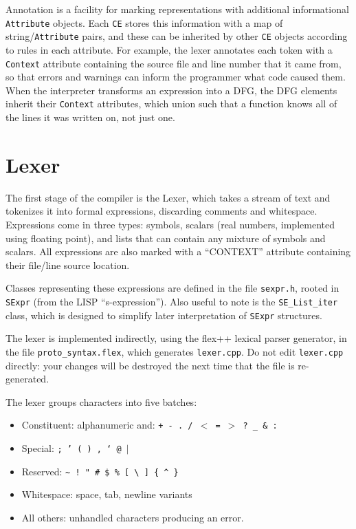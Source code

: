 \documentclass{article}
\newcommand\file[1]{{\tt #1}}
\begin{document}
Annotation is a facility for marking representations with additional
informational {\tt Attribute} objects.  Each {\tt CE} stores this information
with a map of string/{\tt Attribute} pairs, and these can be inherited by other
{\tt CE} objects according to rules in each attribute. For example, the lexer
annotates each token with a {\tt Context} attribute containing the source file
and line number that it came from, so that errors and warnings can inform the
programmer what code caused them.  When the interpreter transforms an expression
into a DFG, the DFG elements inherit their {\tt Context} attributes, which union
such that a function knows all of the lines it was written on, not just one.


\section{Lexer}
\label{s:lexer}

The first stage of the compiler is the Lexer, which takes a stream of text and
tokenizes it into formal expressions, discarding comments and whitespace.
Expressions come in three types: symbols, scalars (real numbers, implemented
using floating point), and lists that can contain any mixture of symbols and
scalars.  All expressions are also marked with a ``CONTEXT'' attribute
containing their file/line source location.

Classes representing these expressions are defined in the file \file{sexpr.h},
rooted in {\tt SExpr} (from the LISP ``s-expression'').  Also useful to note is
the {\tt SE\_List\_iter} class, which is designed to simplify later
interpretation of {\tt SExpr} structures.

The lexer is implemented indirectly, using the flex++ lexical parser generator,
in the file \file{proto\_syntax.flex}, which generates \file{lexer.cpp}.  Do not
edit \file{lexer.cpp} directly: your changes will be destroyed the next time
that the file is re-generated.

The lexer groups characters into five batches:
\begin{itemize}
  \item Constituent: alphanumeric and: {\tt * + - .~/ $<$ = $>$ ?~\_ \& :  }
  \item Special: {\tt ; ' ( ) , ` @ $|$}
  \item Reserved: {\tt \textasciitilde~!~" \# \$ \% [ \textbackslash~]
  \{~\textasciicircum~\} }
  \item Whitespace: space, tab, newline variants
  \item All others: unhandled characters producing an error.
\end{itemize}
\end{document}
